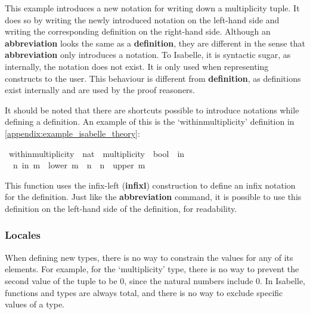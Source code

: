 This example introduces a new notation for writing down a multiplicity tuple. It does so by writing the newly introduced notation on the left-hand side and writing the corresponding definition on the right-hand side. Although an \textbf{abbreviation} looks the same as a \textbf{definition}, they are different in the sense that \textbf{abbreviation} only introduces a notation. To Isabelle, it is syntactic sugar, as internally, the notation does not exist. It is only used when representing constructs to the user. This behaviour is different from \textbf{definition}, as definitions exist internally and are used by the proof reasoners.

It should be noted that there are shortcuts possible to introduce notations while defining a definition. An example of this is the `within{\isacharunderscore}multiplicity' definition in \cref{appendix:example_isabelle_theory}:
\vspace{1em}\begin{isabellebody}
\isamarkupfalse%
\ within{\isacharunderscore}multiplicity\ {\isacharcolon}{\isacharcolon}\ {\isachardoublequoteopen}nat\ {\isasymRightarrow}\ multiplicity\ {\isasymRightarrow}\ bool{\isachardoublequoteclose}\ {\isacharparenleft}\ {\isachardoublequoteopen}in{\isachardoublequoteclose}\ {}{}{\isacharparenright}\ \isanewline
\ \ {\isachardoublequoteopen}n\ in\ m\ {\isasymequiv}\ lower\ m\ {\isasymle}\ \isactrlbold n\ {\isasymand}\ \isactrlbold n\ {\isasymle}\ upper\ m{\isachardoublequoteclose}\isanewline
\end{isabellebody}

This function uses the infix-left (\textbf{infixl}) construction to define an infix notation for the definition. Just like the \textbf{abbreviation} command, it is possible to use this definition on the left-hand side of the definition, for readability.

\subsubsection{Locales}
When defining new types, there is no way to constrain the values for any of its elements. For example, for the `multiplicity' type, there is no way to prevent the second value of the tuple to be 0, since the natural numbers include 0. In Isabelle, functions and types are always total, and there is no way to exclude specific values of a type.

